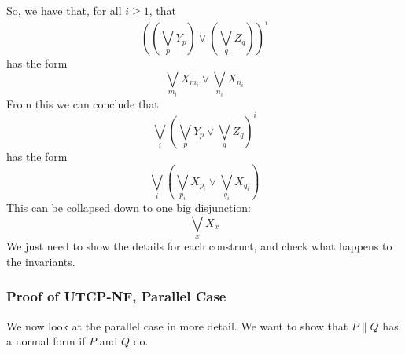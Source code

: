 So, we
have that, for all $i \geq 1$, that
\[
  ((\bigvee_p Y_p) \lor (\bigvee_q Z_q))^i
\]
has the form
\[
 \bigvee_{m_i} X_{m_i} \lor \bigvee_{n_i} X_{n_i}
\]
From this we can conclude
that
\[
 \bigvee_i (\bigvee_p Y_p \lor \bigvee_q Z_q)^i
\]
has the form
\[
  \bigvee_i (\bigvee_{p_i} X_{p_i} \lor \bigvee_{q_i} X_{q_i})
\]
This can be collapsed down to one big disjunction:
\[
  \bigvee_x X_x
\]
We just need to show the details for each construct,
and check what happens to the invariants.

\subsubsection{Proof of \textsf{UTCP-NF}, Parallel Case}

We now look at the parallel case in more detail.
We want to show that $P \parallel Q$ has a normal form
if $P$ and $Q$ do.
